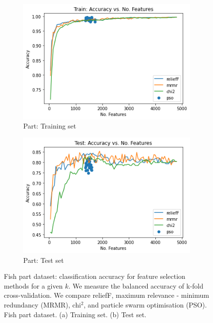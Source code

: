 \documentclass[runningheads]{llncs}
\begin{document}
\begin{figure}[htb]
  \centering
  \begin{subfigure}[b]{.45\linewidth}
    \includegraphics[width=\linewidth]{accuracy-features-part-train.png}
    \caption{Part: Training set}\label{fig:accuracy-features-part-train}
  \end{subfigure}
  \begin{subfigure}[b]{.45\linewidth}
    \includegraphics[width=\linewidth]{accuracy-features-part-test.png}
    \caption{Part: Test set}\label{fig:accuracy-features-part-test}
  \end{subfigure}
  \caption[Two numerical solutions]{
    Fish part dataset: classification accuracy for feature selection methods for a given $k$.
    We measure the balanced accuracy of k-fold cross-validation.
    We compare reliefF, maximum relevance - minimum redundancy (MRMR), chi$^2$, and particle swarm optimisation (PSO).
    Fish part dataset. (a) Training set. (b) Test set.}
  \label{fig:accuracy-features-part-train}
\end{figure}
\end{document}
